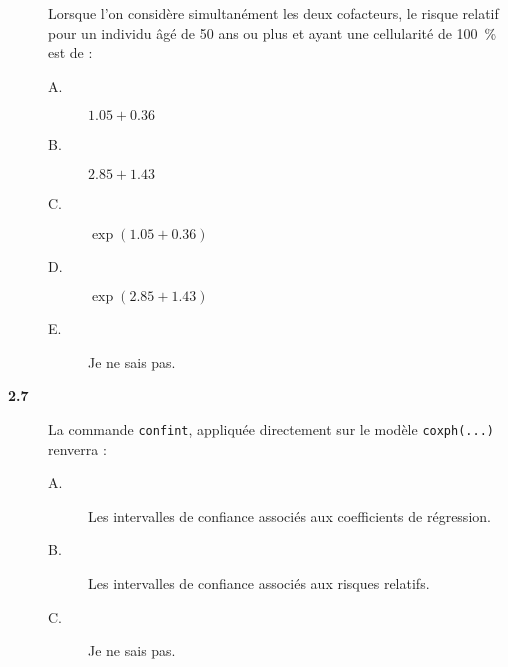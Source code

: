 \documentclass[11pt]{report}
\theoremstyle{definition}
\newcommand{\blankpage}{
  \newpage
  \thispagestyle{empty}
  \mbox{}
  \newpage
  }
\begin{document}
\begin{description}
  Lorsque l'on considère simultanément les deux cofacteurs, le risque
  relatif pour un individu âgé de 50 ans ou plus et ayant une cellularité de
  100~\% est de :
  \begin{description}
  \item[A.] $1.05 + 0.36$
  \item[B.] $2.85 + 1.43$
  \item[C.] $\exp(1.05 + 0.36)$
  \item[D.] $\exp(2.85 + 1.43)$    
  \item[E.] Je ne sais pas.
  \end{description}
\item[\bf 2.7]  La commande \texttt{confint},
  appliquée directement sur le modèle \texttt{coxph(...)} renverra :
  \begin{description}
  \item[A.] Les intervalles de confiance associés aux coefficients de
    régression. 
  \item[B.] Les intervalles de confiance associés aux risques relatifs.
  \item[C.] Je ne sais pas.
  \end{description}  
\end{description}

\blankpage
\blankpage
\end{document}

